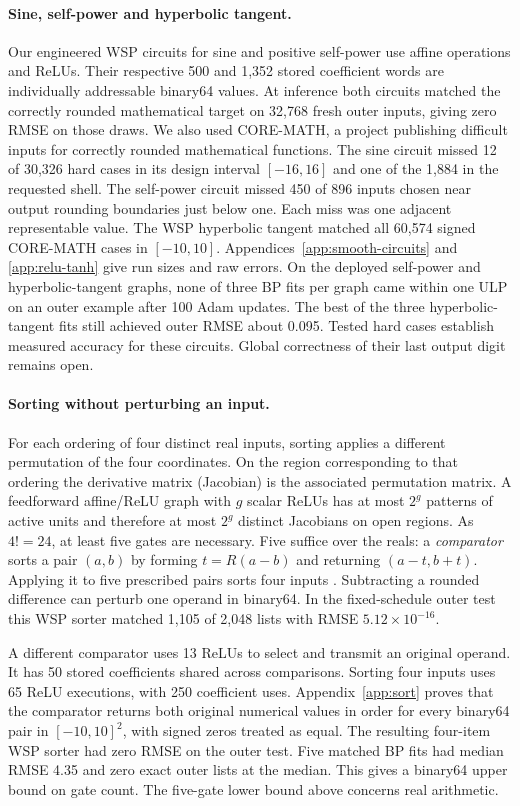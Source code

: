 \paragraph{Sine, self-power and hyperbolic tangent.}
Our engineered WSP circuits for sine and positive self-power use affine operations and ReLUs. Their respective 500 and 1,352 stored coefficient words are individually addressable binary64 values. At inference both circuits matched the correctly rounded mathematical target on 32,768 fresh outer inputs, giving zero RMSE on those draws. We also used CORE-MATH, a project publishing difficult inputs for correctly rounded mathematical functions. The sine circuit missed 12 of 30,326 hard cases in its design interval $[-16,16]$ and one of the 1,884 in the requested shell. The self-power circuit missed 450 of 896 inputs chosen near output rounding boundaries just below one. Each miss was one adjacent representable value. The WSP hyperbolic tangent matched all 60,574 signed CORE-MATH cases in $[-10,10]$. Appendices~\ref{app:smooth-circuits} and \ref{app:relu-tanh} give run sizes and raw errors. On the deployed self-power and hyperbolic-tangent graphs, none of three BP fits per graph came within one ULP on an outer example after 100 Adam updates. The best of the three hyperbolic-tangent fits still achieved outer RMSE about 0.095. Tested hard cases establish measured accuracy for these circuits. Global correctness of their last output digit remains open.

\paragraph{Sorting without perturbing an input.}
For each ordering of four distinct real inputs, sorting applies a different permutation of the four coordinates. On the region corresponding to that ordering the derivative matrix (Jacobian) is the associated permutation matrix. A feedforward affine/ReLU graph with $g$ scalar ReLUs has at most $2^g$ patterns of active units and therefore at most $2^g$ distinct Jacobians on open regions. As $4!=24$, at least five gates are necessary. Five suffice over the reals: a \emph{comparator} sorts a pair $(a,b)$ by forming $t=R(a-b)$ and returning $(a-t,b+t)$. Applying it to five prescribed pairs sorts four inputs \cite{batcher1968sorting}. Subtracting a rounded difference can perturb one operand in binary64. In the fixed-schedule outer test this WSP sorter matched 1,105 of 2,048 lists with RMSE $5.12\times10^{-16}$.

A different comparator uses 13 ReLUs to select and transmit an original operand. It has 50 stored coefficients shared across comparisons. Sorting four inputs uses 65 ReLU executions, with 250 coefficient uses. Appendix~\ref{app:sort} proves that the comparator returns both original numerical values in order for every binary64 pair in $[-10,10]^2$, with signed zeros treated as equal. The resulting four-item WSP sorter had zero RMSE on the outer test. Five matched BP fits had median RMSE 4.35 and zero exact outer lists at the median. This gives a binary64 upper bound on gate count. The five-gate lower bound above concerns real arithmetic.
